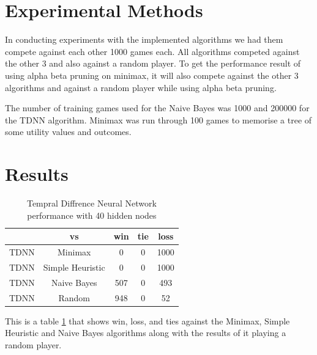 \documentclass[12pt,letterpaper]{article}
\begin{document}
\section{Experimental Methods}
In conducting experiments with the implemented algorithms we had them compete against each other 1000 games each. All algorithms competed against the other 3 and also against a random player. To get the performance result of using alpha beta pruning on minimax, it will also compete against the other 3 algorithms and against a random player while using alpha beta pruning.

The number of training games used for the Naive Bayes was 1000 and 200000 for the TDNN algorithm. Minimax was run through 100 games to memorise a tree of some utility values and outcomes. 


\clearpage
\newpage

\section{Results}

\begin{table}[h]
\begin{center}
\begin{tabular}{|c||c|c|c|c|}
\hline
& vs & win & tie & loss\\
\hline \hline
TDNN & Minimax & 0 & 0 & 1000\\
\hline 
TDNN & Simple Heuristic & 0 & 0 & 1000\\
\hline 
TDNN & Naive Bayes & 507 & 0 & 493\\
\hline 
TDNN & Random & 948 & 0 & 52\\
\hline 
\end{tabular}
\end{center}
\caption{Tempral Diffrence Neural Network performance with 40 hidden nodes}
\label{TDNNtable}
\end{table}

This is a table \ref{TDNNtable} that shows win, loss, and ties against the Minimax, Simple Heuristic and Naive Bayes algorithms along with the results of it playing a random player.
\end{document}
